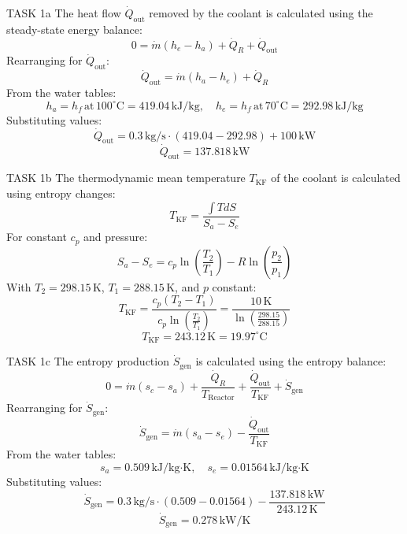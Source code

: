 TASK 1a  
The heat flow \( \dot{Q}_{\text{out}} \) removed by the coolant is calculated using the steady-state energy balance:  
\[
0 = \dot{m} (h_e - h_a) + \dot{Q}_R + \dot{Q}_{\text{out}}
\]  
Rearranging for \( \dot{Q}_{\text{out}} \):  
\[
\dot{Q}_{\text{out}} = \dot{m} (h_a - h_e) + \dot{Q}_R
\]  
From the water tables:  
\[
h_a = h_f \, \text{at} \, 100^\circ\text{C} = 419.04 \, \text{kJ/kg}, \quad h_e = h_f \, \text{at} \, 70^\circ\text{C} = 292.98 \, \text{kJ/kg}
\]  
Substituting values:  
\[
\dot{Q}_{\text{out}} = 0.3 \, \text{kg/s} \cdot (419.04 - 292.98) + 100 \, \text{kW}
\]  
\[
\dot{Q}_{\text{out}} = 137.818 \, \text{kW}
\]  

TASK 1b  
The thermodynamic mean temperature \( T_{\text{KF}} \) of the coolant is calculated using entropy changes:  
\[
T_{\text{KF}} = \frac{\int T dS}{S_a - S_e}
\]  
For constant \( c_p \) and pressure:  
\[
S_a - S_e = c_p \ln \left( \frac{T_2}{T_1} \right) - R \ln \left( \frac{p_2}{p_1} \right)
\]  
With \( T_2 = 298.15 \, \text{K} \), \( T_1 = 288.15 \, \text{K} \), and \( p \) constant:  
\[
T_{\text{KF}} = \frac{c_p (T_2 - T_1)}{c_p \ln \left( \frac{T_2}{T_1} \right)} = \frac{10 \, \text{K}}{\ln \left( \frac{298.15}{288.15} \right)}
\]  
\[
T_{\text{KF}} = 243.12 \, \text{K} = 19.97^\circ\text{C}
\]  

TASK 1c  
The entropy production \( \dot{S}_{\text{gen}} \) is calculated using the entropy balance:  
\[
0 = \dot{m} (s_c - s_a) + \frac{\dot{Q}_R}{T_{\text{Reactor}}} + \frac{\dot{Q}_{\text{out}}}{T_{\text{KF}}} + \dot{S}_{\text{gen}}
\]  
Rearranging for \( \dot{S}_{\text{gen}} \):  
\[
\dot{S}_{\text{gen}} = \dot{m} (s_a - s_e) - \frac{\dot{Q}_{\text{out}}}{T_{\text{KF}}}
\]  
From the water tables:  
\[
s_a = 0.509 \, \text{kJ/kg·K}, \quad s_e = 0.01564 \, \text{kJ/kg·K}
\]  
Substituting values:  
\[
\dot{S}_{\text{gen}} = 0.3 \, \text{kg/s} \cdot (0.509 - 0.01564) - \frac{137.818 \, \text{kW}}{243.12 \, \text{K}}
\]  
\[
\dot{S}_{\text{gen}} = 0.278 \, \text{kW/K}
\]